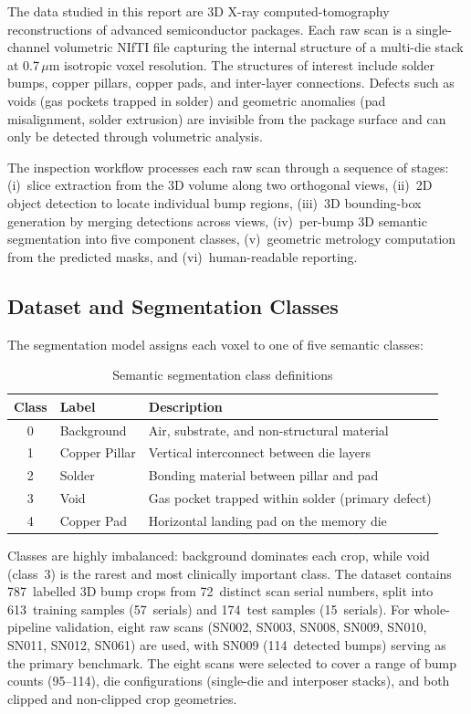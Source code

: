The data studied in this report are 3D X-ray computed-tomography reconstructions of advanced semiconductor packages. Each raw scan is a single-channel volumetric NIfTI file capturing the internal structure of a multi-die stack at 0.7\,$\mu$m isotropic voxel resolution. The structures of interest include solder bumps, copper pillars, copper pads, and inter-layer connections. Defects such as voids (gas pockets trapped in solder) and geometric anomalies (pad misalignment, solder extrusion) are invisible from the package surface and can only be detected through volumetric analysis.

The inspection workflow processes each raw scan through a sequence of stages: (i)~slice extraction from the 3D volume along two orthogonal views, (ii)~2D object detection to locate individual bump regions, (iii)~3D bounding-box generation by merging detections across views, (iv)~per-bump 3D semantic segmentation into five component classes, (v)~geometric metrology computation from the predicted masks, and (vi)~human-readable reporting.

\subsection{Dataset and Segmentation Classes}

The segmentation model assigns each voxel to one of five semantic classes:

\begin{table}[H]
\centering
\caption{Semantic segmentation class definitions}
\label{tab:classes}
\renewcommand{\arraystretch}{1.15}
\begin{tabular}{c l l}
\toprule
\textbf{Class} & \textbf{Label} & \textbf{Description} \\
\midrule
0 & Background    & Air, substrate, and non-structural material \\
1 & Copper Pillar & Vertical interconnect between die layers \\
2 & Solder        & Bonding material between pillar and pad \\
3 & Void          & Gas pocket trapped within solder (primary defect) \\
4 & Copper Pad    & Horizontal landing pad on the memory die \\
\bottomrule
\end{tabular}
\end{table}

Classes are highly imbalanced: background dominates each crop, while void (class~3) is the rarest and most clinically important class. The dataset contains 787~labelled 3D bump crops from 72~distinct scan serial numbers, split into 613~training samples (57~serials) and 174~test samples (15~serials). For whole-pipeline validation, eight raw scans (SN002, SN003, SN008, SN009, SN010, SN011, SN012, SN061) are used, with SN009 (114~detected bumps) serving as the primary benchmark. The eight scans were selected to cover a range of bump counts (95--114), die configurations (single-die and interposer stacks), and both clipped and non-clipped crop geometries.

